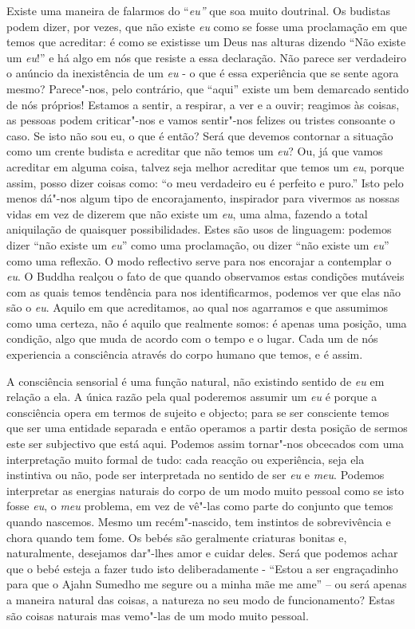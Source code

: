 Existe uma maneira de falarmos do ``\emph{eu''} que soa muito doutrinal.
Os budistas podem dizer, por vezes, que não existe \emph{eu} como se
fosse uma proclamação em que temos que acreditar: é como se existisse um
Deus nas alturas dizendo ``Não existe um \emph{eu}!'' e há algo em nós
que resiste a essa declaração. Não parece ser verdadeiro o anúncio da
inexistência de um \emph{eu} - o que é essa experiência que se sente
agora mesmo? Parece"-nos, pelo contrário, que ``aqui'' existe um bem
demarcado sentido de nós próprios! Estamos a sentir, a respirar, a ver e
a ouvir; reagimos às coisas, as pessoas podem criticar"-nos e vamos
sentir"-nos felizes ou tristes consoante o caso. Se isto não sou eu, o
que é então? Será que devemos contornar a situação como um crente
budista e acreditar que não temos um \emph{eu}? Ou, já que vamos
acreditar em alguma coisa, talvez seja melhor acreditar que temos um
\emph{eu}, porque assim, posso dizer coisas como: ``o meu verdadeiro eu
é perfeito e puro.'' Isto pelo menos dá"-nos algum tipo de encorajamento,
inspirador para vivermos as nossas vidas em vez de dizerem que não
existe um \emph{eu}, uma alma, fazendo a total aniquilação de quaisquer
possibilidades. Estes são usos de linguagem: podemos dizer ``não existe
um \emph{eu}'' como uma proclamação, ou dizer ``não existe um
\emph{eu}'' como uma reflexão. O modo reflectivo serve para nos
encorajar a contemplar o \emph{eu}. O Buddha realçou o fato de que
quando observamos estas condições mutáveis com as quais temos tendência
para nos identificarmos, podemos ver que elas não são o \emph{eu}.
Aquilo em que acreditamos, ao qual nos agarramos e que assumimos como
uma certeza, não é aquilo que realmente somos: é apenas uma posição, uma
condição, algo que muda de acordo com o tempo e o lugar. Cada um de nós
experiencia a consciência através do corpo humano que temos, e é assim.

A consciência sensorial é uma função natural, não existindo sentido de
\emph{eu} em relação a ela. A única razão pela qual poderemos assumir um
\emph{eu} é porque a consciência opera em termos de sujeito e objecto;
para se ser consciente temos que ser uma entidade separada e então
operamos a partir desta posição de sermos este ser subjectivo que está
aqui. Podemos assim tornar"-nos obcecados com uma interpretação muito
formal de tudo: cada reacção ou experiência, seja ela instintiva ou não,
pode ser interpretada no sentido de ser \emph{eu} e \emph{meu}. Podemos
interpretar as energias naturais do corpo de um modo muito pessoal como
se isto fosse \emph{eu}, o \emph{meu} problema, em vez de vê"-las como
parte do conjunto que temos quando nascemos. Mesmo um recém"-nascido, tem
instintos de sobrevivência e chora quando tem fome. Os bebés são
geralmente criaturas bonitas e, naturalmente, desejamos dar"-lhes amor e
cuidar deles. Será que podemos achar que o bebé esteja a fazer tudo isto
deliberadamente - ``Estou a ser engraçadinho para que o Ajahn Sumedho me
segure ou a minha mãe me ame'' -- ou será apenas a maneira natural das
coisas, a natureza no seu modo de funcionamento? Estas são coisas
naturais mas vemo"-las de um modo muito pessoal.

